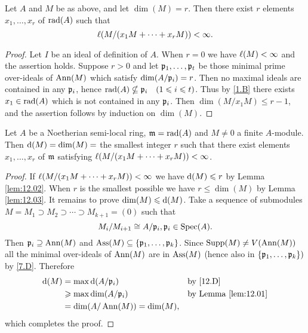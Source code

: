 \documentclass[../main]{subfiles}
\begin{document}
\begin{parlemma}\label{lem:12.03}
Let $A$ and $M$ be as above, and let $\dim(M)=r$. Then there exist $r$ elements $x_1, \ldots, x_r$ of $\operatorname{rad}(A)$ such that \[\ell(M / (x_1 M+\cdots+x_r M))<\infty.\]
\end{parlemma}

\begin{proof}
Let $I$ be an ideal of definition of $A$. When $r=0$ we have $\ell(M)<\infty$ and the assertion holds. Suppose $r>0$ and let $\mathfrak{p}_1, \dots, \mathfrak{p}_t$ be those minimal prime over-ideals of $\operatorname{Ann}(M)$ which satisfy $\operatorname{dim}(A / \mathfrak{p}_i)=r$. Then no maximal ideals are contained in any $\mathfrak{p}_i$, hence $\rad(A) \nsubseteq \ideal{p}_i\for{1 \leqslant i \leqslant t}$. Thus by \ref{1.B} there exists $x_1 \in \operatorname{rad}(A)$ which is not contained in any $\mathfrak{p}_i$. Then $\dim(M / x_1 M) \leqslant r-1$, and the assertion follows by induction on $\dim(M)$.
\end{proof}

\begin{partheorem}\label{thm:017}
Let $A$ be a Noetherian semi-local ring, $\mathfrak{m}=\operatorname{rad}(A)$ and $M \neq 0$ a finite $A$-module. Then $\mathrm{d}(M)=\operatorname{dim} (M)=$ the smallest integer $r$ such that there exist elements $x_1,\ldots, x_r$ of $\mathfrak{m}$ satisfying $\ell(M / (x_1 M+\cdots+x_r M))<\infty$.
\end{partheorem}

\begin{proof}
If $\ell(M / (x_1 M+\cdots+x_r M))<\infty$ we have $\mathrm{d}(M)\leqslant r$ by Lemma \ref{lem:12.02}. When $r$ is the smallest possible we have $r \leqslant \dim(M)$ by Lemma \ref{lem:12.03}. It remains to prove $\operatorname{dim}(M) \leqslant \mathrm{d}(M)$. Take a sequence of submodules $M=M_1\supset M_2 \supset \cdots \supset M_{k+1}=(0)$ such that \[M_i / M_{i+1} \cong A / \mathfrak{p}_i, \mathfrak{p}_i \in \operatorname{Spec}(A).\] Then $\mathfrak{p}_i \supseteq\operatorname{Ann}(M)$ and $\operatorname{Ass}(M)\subseteq\{\mathfrak{p}_1, \dots, \mathfrak{p}_k\}$. Since $\operatorname{Supp}(M) \neq V(\operatorname{Ann}(M))$ all the minimal over-ideals of $\operatorname{Ann}(M)$ are in $\operatorname{Ass}(M)$ (hence also in $\{\mathfrak{p}_1, \dots, \mathfrak{p}_k\})$ by \ref{7.D}. Therefore
\begin{align*}
    \mathrm{d}(M)&=\max\mathrm{d}(A/\mathfrak{p}_i) & &\text{by \ref{12.D}}\\
    &\geqslant\max\operatorname{dim}(A/\mathfrak{p}_i) & &\text{by Lemma \ref{lem:12.01}}\\
    &=\operatorname{dim}(A/\operatorname{Ann}(M))=\operatorname{dim}(M), & &
\end{align*}
which completes the proof.
\end{proof} 
\end{document}
